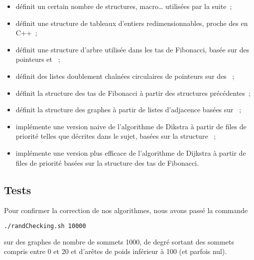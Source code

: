 \documentclass[12p0t,a4paper]{article}
\begin{document}
\begin{itemize}
\item {} définit un certain nombre de structures, macro\ldots{} utilisées par la suite~;

\item {} définit une structure de tableaux d'entiers redimensionnables, proche des  en C++~;

\item {} définit une structure d'arbre utilisée dans les tas de Fibonacci, basée sur des pointeurs  et ~;

\item {} définit des listes doublement chaînées circulaires de pointeurs sur des ~;

\item {} définit la structure des tas de Fibonacci à partir des structures précédentes~;

\item {} définit la structure des graphes à partir de listes d'adjacence basées sur ~;

\item {} implémente une version naive de l'algorithme de Dikstra à partir de files de priorité telles que décrites dans le sujet, basées sur la structure ~;

\item {} implémente une version plus efficace de l'algorithme de Dijkstra à partir de files de priorité basées sur la structure des tas de Fibonacci.
\end{itemize}

\subsection{Tests}

Pour confirmer la correction de nos algorithmes, nous avons passé la commande

\begin{lstlisting}[language=bash]
./randChecking.sh 10000
\end{lstlisting}

sur des graphes de nombre de sommets 1000, de degré sortant des sommets compris entre 0 et 20 et d'arêtes de poids inférieur à 100 (et parfois nul).
\end{document}
